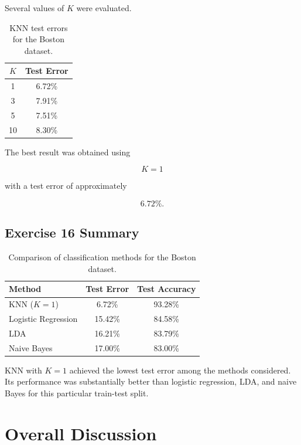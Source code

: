 \documentclass[12pt,a4paper]{article}
\begin{document}
Several values of $K$ were evaluated.

\begin{table}[H]
\centering
\begin{tabular}{cc}
\toprule
$K$ & Test Error \\
\midrule
1 & 6.72\% \\
3 & 7.91\% \\
5 & 7.51\% \\
10 & 8.30\% \\
\bottomrule
\end{tabular}
\caption{KNN test errors for the Boston dataset.}
\end{table}

The best result was obtained using

\[
\boxed{K=1}
\]

with a test error of approximately

\[
\boxed{6.72\%}.
\]

\subsection{Exercise 16 Summary}

\begin{table}[H]
\centering
\begin{tabular}{lcc}
\toprule
Method & Test Error & Test Accuracy \\
\midrule
KNN ($K=1$) & 6.72\% & 93.28\% \\
Logistic Regression & 15.42\% & 84.58\% \\
LDA & 16.21\% & 83.79\% \\
Naive Bayes & 17.00\% & 83.00\% \\
\bottomrule
\end{tabular}
\caption{Comparison of classification methods for the Boston dataset.}
\end{table}

KNN with $K=1$ achieved the lowest test error among the methods considered.
Its performance was substantially better than logistic regression, LDA, and
naive Bayes for this particular train-test split.


\section{Overall Discussion}
\end{document}
